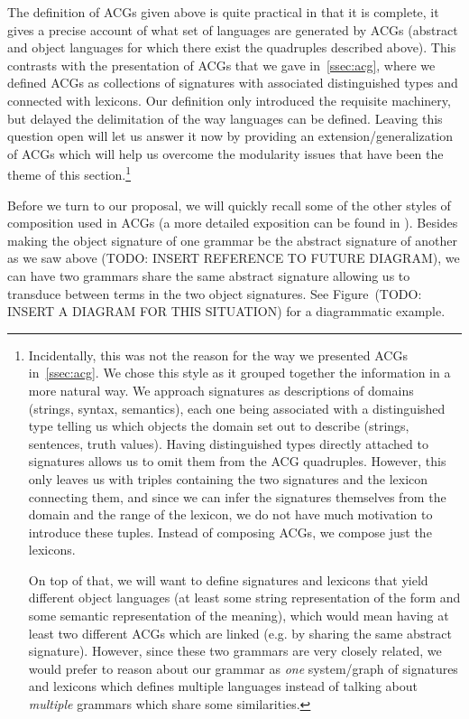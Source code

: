 The definition of ACGs given above is quite practical in that it is
complete, it gives a precise account of what set of languages are
generated by ACGs (abstract and object languages for which there exist
the quadruples described above). This contrasts with the presentation of
ACGs that we gave in~\ref{ssec:acg}, where we defined ACGs as
collections of signatures with associated distinguished types and
connected with lexicons. Our definition only introduced the requisite
machinery, but delayed the delimitation of the way languages can be
defined. Leaving this question open will let us answer it now by
providing an extension/generalization of ACGs which will help us
overcome the modularity issues that have been the theme of this
section.\footnote{Incidentally, this was not the reason for the way we
  presented ACGs in~\ref{ssec:acg}. We chose this style as it grouped
  together the information in a more natural way. We approach signatures
  as descriptions of domains (strings, syntax, semantics), each one
  being associated with a distinguished type telling us which objects
  the domain set out to describe (strings, sentences, truth
  values). Having distinguished types directly attached to signatures
  allows us to omit them from the ACG quadruples. However, this only
  leaves us with triples containing the two signatures and the lexicon
  connecting them, and since we can infer the signatures themselves from
  the domain and the range of the lexicon, we do not have much
  motivation to introduce these tuples. Instead of composing ACGs, we
  compose just the lexicons.

On top of that, we will want to define signatures and lexicons that
yield different object languages (at least some string representation of
the form and some semantic representation of the meaning), which would
mean having at least two different ACGs which are linked (e.g. by
sharing the same abstract signature). However, since these two grammars
are very closely related, we would prefer to reason about our grammar as
\emph{one} system/graph of signatures and lexicons which defines
multiple languages instead of talking about \emph{multiple} grammars
which share some similarities.}

Before we turn to our proposal, we will quickly recall some of the other
styles of composition used in ACGs (a more detailed exposition can be
found in \cite{pogodalla2012controlling}). Besides making the object
signature of one grammar be the abstract signature of another as we saw
above (TODO: INSERT REFERENCE TO FUTURE DIAGRAM), we can have two
grammars share the same abstract signature allowing us to transduce
between terms in the two object signatures. See Figure~(TODO: INSERT A
DIAGRAM FOR THIS SITUATION) for a diagrammatic example.

